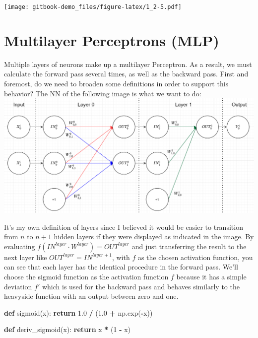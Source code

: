 \documentclass[
]{book}
\newenvironment{Shaded}{\begin{snugshade}}{\end{snugshade}}
\newcommand{\ControlFlowTok}[1]{\textcolor[rgb]{0.13,0.29,0.53}{\textbf{#1}}}
\newcommand{\DecValTok}[1]{\textcolor[rgb]{0.00,0.00,0.81}{#1}}
\newcommand{\FloatTok}[1]{\textcolor[rgb]{0.00,0.00,0.81}{#1}}
\newcommand{\KeywordTok}[1]{\textcolor[rgb]{0.13,0.29,0.53}{\textbf{#1}}}
\newcommand{\NormalTok}[1]{#1}
\newcommand{\OperatorTok}[1]{\textcolor[rgb]{0.81,0.36,0.00}{\textbf{#1}}}
\begin{document}
\texttt{[image: gitbook-demo\_files/figure-latex/1\_2-5.pdf]}

\hypertarget{multilayer-perceptrons-mlp}{%
\chapter{Multilayer Perceptrons (MLP)}\label{multilayer-perceptrons-mlp}}

Multiple layers of neurons make up a multilayer Perceptron. As a result, we must calculate the forward pass several times, as well as the backward pass. First and foremost, do we need to broaden some definitions in order to support this behavior? The NN of the following image is what we want to do:\\
\includegraphics[width=1\textwidth,height=\textheight]{./img/NN_03_new.png}

It's my own definition of layers since I believed it would be easier to transition from \(n\) to \(n+1\) hidden layers if they were displayed as indicated in the image. By evaluating \(f(IN^{layer} \cdot W^{layer}) = OUT^{layer}\) and just transferring the result to the next layer like \(OUT^{layer} = IN^{layer+1}\), with \(f\) as the chosen activation function, you can see that each layer has the identical procedure in the forward pass.
We'll choose the sigmoid function as the activation function \(f\) because it has a simple deviation \(f'\) which is used for the backward pass and behaves similarly to the heavyside function with an output between zero and one.

\begin{Shaded}
\begin{Highlighting}[]
\KeywordTok{def}\NormalTok{ sigmoid(x):}
  \ControlFlowTok{return} \FloatTok{1.0} \OperatorTok{/}\NormalTok{ (}\FloatTok{1.0} \OperatorTok{+}\NormalTok{ np.exp(}\OperatorTok{{-}}\NormalTok{x))}

\KeywordTok{def}\NormalTok{ deriv\_sigmoid(x):}
  \ControlFlowTok{return}\NormalTok{ x }\OperatorTok{*}\NormalTok{ (}\DecValTok{1} \OperatorTok{{-}}\NormalTok{ x)}
\end{Highlighting}
\end{Shaded}
\end{document}
